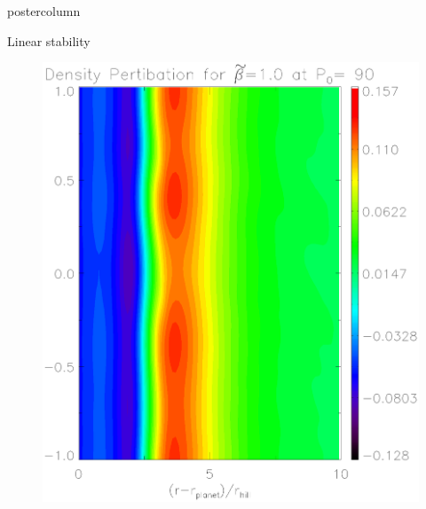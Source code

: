 \documentclass[final,hyperref={pdfpagelabels=false}]{beamer}
\begin{document}
\begin{frame}
\begin{columns}
\begin{column}{.49\textwidth}
\begin{beamercolorbox}[center,wd=\textwidth]{postercolumn}
\begin{minipage}[T]{.95\textwidth}
{\begin{block}{{\Large Linear stability}}
\begin{figure}
\begin{minipage}{0.45\textwidth}
                      \includegraphics[width=\textwidth]{Posterfig_medb}
                    \end{minipage}
                    \hfill
                  \end{figure}


\end{block}}
\end{minipage}
\end{beamercolorbox}
\end{column}
\end{columns}
\end{frame}
\end{document}
